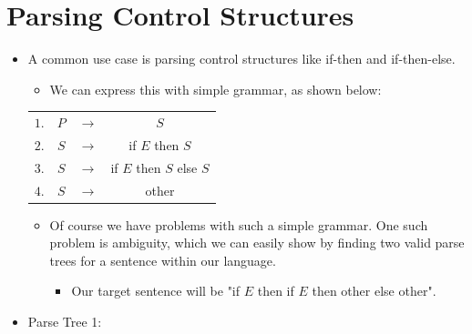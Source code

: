 \documentclass{article}
\begin{document}
\section{Parsing Control Structures}
\begin{itemize}
    \item A common use case is parsing control structures like if-then and if-then-else.
    \begin{itemize}
        \item We can express this with simple grammar, as shown below:
    \end{itemize}
    \begin{center}
        \begin{tabular}{ |c c c c| }
            \hline
            $1.$ & $P$ & ${\rightarrow}$ & $S$ \\
            $2.$ & $S$ & ${\rightarrow}$ & if $E$ then $S$ \\
            $3.$ & $S$ & ${\rightarrow}$ & if $E$ then $S$ else $S$ \\
            $4.$ & $S$ & ${\rightarrow}$ & other \\
            \hline
        \end{tabular}
    \end{center}
    \begin{itemize}
        \item Of course we have problems with such a simple grammar. One such problem is ambiguity, which we can easily show by finding two valid parse trees for a sentence within our language.
        \begin{itemize}
            \item Our target sentence will be "if $E$ then if $E$ then other else other".\
        \end{itemize}
    \end{itemize}
    \pagebreak
    \item Parse Tree 1:
    \begin{center}

\end{center}
\end{itemize}
\end{document}
